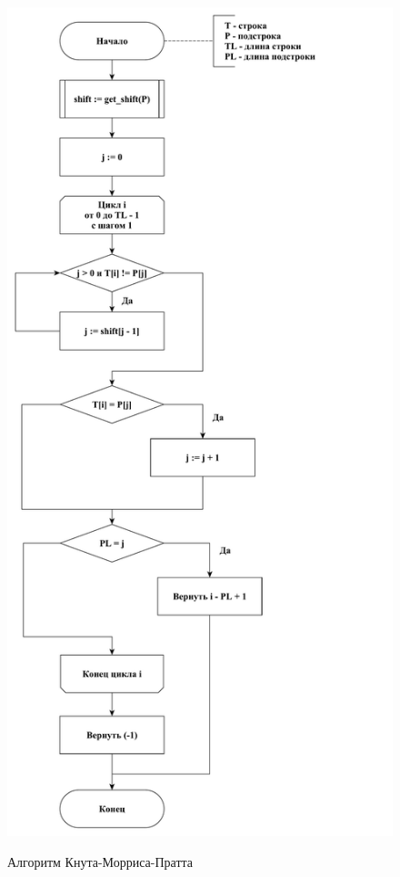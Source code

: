 \documentclass[a4paper,12pt]{article}
\begin{document}
\begin{figure}[h!]
	\begin{center}
		{\includegraphics[scale = 0.4]{kmp.pdf}}
		\caption{
			Алгоритм Кнута-Морриса-Пратта}
		\label{fig:kmp}
	\end{center}
\end{figure}
\end{document}
